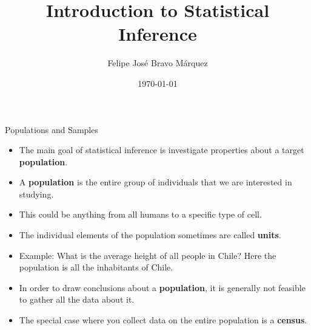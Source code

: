\documentclass[handout]{beamer}
\title{Introduction to Statistical Inference}
\author[Felipe Bravo Márquez]{\footnotesize
 \textcolor[rgb]{0.00,0.00,1.00}{Felipe José Bravo Márquez}}
\date{ \today }
\begin{document}
\begin{frame}
\titlepage


\end{frame}




\begin{frame}{Populations and Samples}
\scriptsize{
\begin{itemize}
 
 \item The main goal of statistical inference is investigate properties about a target \textbf{population}.
 
 \item A \textbf{population} is the entire group of individuals that we are interested in studying.
 \item  This could be anything from all humans to a specific type of cell.
 
 \item The individual elements of the population sometimes are  called \textbf{units}.



 \item Example: What is the average height of all people in Chile? Here the population is all the inhabitants of Chile. 
 
 
 \item In order to draw conclusions about a \textbf{population}, it is generally not feasible to gather all the data about it.
 
 \item The special case where you collect data on the entire population is a \textbf{census}.

\end{itemize}

} 
\end{frame}
\end{document}
